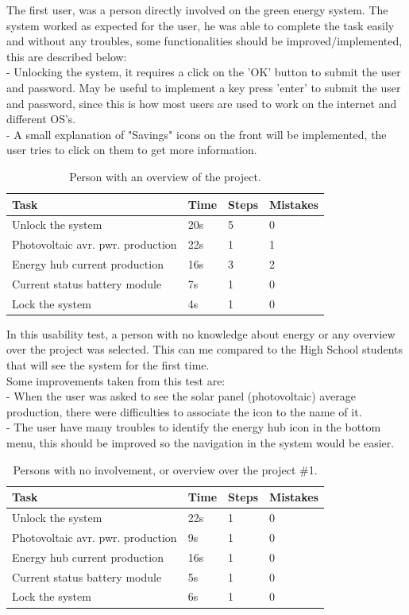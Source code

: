 The first user, was a person directly involved on the green energy system. The system worked as expected for the user, he was able to complete the task easily and without any troubles, some functionalities should be improved/implemented, this are described below:\\
- Unlocking the system, it requires a click on the 'OK' button to submit the user and password. May be useful to implement a key press 'enter' to submit the user and password, since this is how most users are used to work on the internet and different OS's.\\
- A small explanation of "Savings" icons on the front will be implemented, the user tries to click on them to get more information.\\

\begin{table}[H]
\begin{tabular}{ | l | l | l | l |}
	\hline
	Task & Time & Steps & Mistakes \\ \hline
	Unlock the system & 20s & 5 & 0 \\ \hline
	Photovoltaic avr. pwr. production & 22s & 1 & 1 \\ \hline
	Energy hub current production & 16s & 3 & 2 \\ \hline
	Current status battery module & 7s & 1 & 0 \\ \hline
	Lock the system & 4s & 1 & 0 \\ \hline
\end{tabular}
\caption{Person with an overview of the project.}
\end{table}

In this usability test, a person with no knowledge about energy or any overview over the project was selected. This can me compared to the High School students that will see the system for the first time.\\
Some improvements taken from this test are:\\
- When the user was asked to see the solar panel (photovoltaic) average production, there were difficulties to associate the icon to the name of it.\\
- The user have many troubles to identify the energy hub icon in the bottom menu, this should be improved so the navigation in the system would be easier.\\

\begin{table}[H]
\begin{tabular}{ | l | l | l | l |}
	\hline
	Task & Time & Steps & Mistakes \\ \hline
	Unlock the system & 22s & 1 & 0 \\ \hline
	Photovoltaic avr. pwr. production & 9s & 1 & 0 \\ \hline
	Energy hub current production & 16s & 1 & 0 \\ \hline
	Current status battery module & 5s & 1 & 0 \\ \hline
	Lock the system & 6s & 1 & 0\\ \hline
\end{tabular}
\caption{Persons with no involvement, or overview over the project \#1.}
\end{table}


